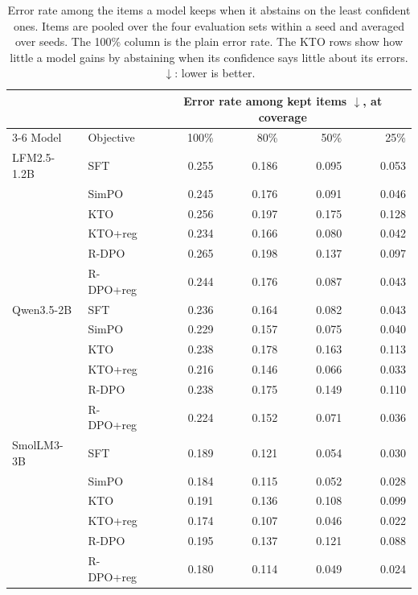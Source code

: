 \begin{table}[t]
\centering
\caption{Error rate among the items a model keeps when it abstains on the least confident ones. Items are pooled over the four evaluation sets within a seed and averaged over seeds. The 100\% column is the plain error rate. The KTO rows show how little a model gains by abstaining when its confidence says little about its errors. $\downarrow$: lower is better.}
\label{tab:coverage}
\small
\begin{tabular}{llrrrr}
\toprule
& & \multicolumn{4}{c}{Error rate among kept items $\downarrow$, at coverage} \\ \cmidrule(lr){3-6}
Model & Objective & 100\% & 80\% & 50\% & 25\% \\
\midrule
LFM2.5-1.2B & SFT & 0.255 & 0.186 & 0.095 & 0.053 \\
 & SimPO & 0.245 & 0.176 & 0.091 & 0.046 \\
 & KTO & 0.256 & 0.197 & 0.175 & 0.128 \\
 & KTO+reg & 0.234 & 0.166 & 0.080 & 0.042 \\
 & R-DPO & 0.265 & 0.198 & 0.137 & 0.097 \\
 & R-DPO+reg & 0.244 & 0.176 & 0.087 & 0.043 \\
\addlinespace
Qwen3.5-2B & SFT & 0.236 & 0.164 & 0.082 & 0.043 \\
 & SimPO & 0.229 & 0.157 & 0.075 & 0.040 \\
 & KTO & 0.238 & 0.178 & 0.163 & 0.113 \\
 & KTO+reg & 0.216 & 0.146 & 0.066 & 0.033 \\
 & R-DPO & 0.238 & 0.175 & 0.149 & 0.110 \\
 & R-DPO+reg & 0.224 & 0.152 & 0.071 & 0.036 \\
\addlinespace
SmolLM3-3B & SFT & 0.189 & 0.121 & 0.054 & 0.030 \\
 & SimPO & 0.184 & 0.115 & 0.052 & 0.028 \\
 & KTO & 0.191 & 0.136 & 0.108 & 0.099 \\
 & KTO+reg & 0.174 & 0.107 & 0.046 & 0.022 \\
 & R-DPO & 0.195 & 0.137 & 0.121 & 0.088 \\
 & R-DPO+reg & 0.180 & 0.114 & 0.049 & 0.024 \\
\bottomrule
\end{tabular}
\end{table}
